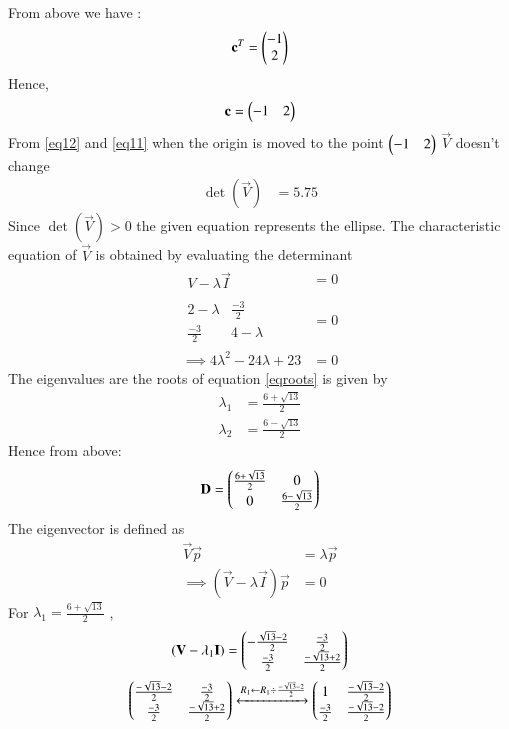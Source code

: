 \documentclass[journal,12pt,twocolumn]{IEEEtran}
\begin{document}
From above we have :
\begin{align}
 \mathbf{c}^T=
 \begin{pmatrix}
 -1\\2
 \end{pmatrix}
\end{align}
Hence,
\begin{align}
 \mathbf c=
\begin{pmatrix}
-1 &2\end{pmatrix}
\end{align}
From \eqref{eq12} and \eqref{eq11} when the origin is moved to the point  $\begin{pmatrix}-1 &2\end{pmatrix}$  $\vec{V}$ doesn't change
\begin{align}
    \det(\vec{V})&=5.75
\end{align}
Since $\det(\vec{V})>0$ the given equation represents the ellipse.
The characteristic equation of $\vec{V}$ is obtained by evaluating the determinant 
\begin{align}
       \begin{array}{|c|}
V-\lambda\vec{I}
\end{array}&=0\\
   \begin{array}{|cc|}
2-\lambda & \frac{-3}{2} \\ \frac{-3}{2} & 4-\lambda
\end{array}&=0\\
\implies 4\lambda^2-24\lambda+23&=0\label{eqroots}
\end{align}
The eigenvalues are the roots of equation \ref{eqroots} is given by 
\begin{align}
    \lambda_1&=\frac{6+\sqrt{13}}{2}\label{eqeig1}\\
    \lambda_2&=\frac{6-\sqrt{13}}{2}\label{eqeig2}
\end{align}
Hence from above:
\begin{align}\label{d}
    \mathbf{D}=
    \begin{pmatrix}
    \frac{6+\sqrt{13}}{2} & 0\\
     0 &\frac{6-\sqrt{13}}{2}
    \end{pmatrix}
\end{align}
The eigenvector  is defined as 
\begin{align}
    \vec{V}\vec{p}&=\lambda\vec{p}\\
    \implies (\vec{V}-\lambda\vec{I})\vec{p}&=0\label{eqev}
\end{align}
For $\lambda_1=\frac{6+\sqrt{13}}{2}$ ,
\begin{align}
    (\mathbf{V}-\lambda_1\mathbf{I})=\begin{pmatrix}-\frac{\sqrt{13}-2}{2} & \frac{-3}{2} \\\frac{-3}{2} & \frac{-\sqrt{13}+2}{2}\end{pmatrix}
\end{align}
\begin{align}
   \begin{pmatrix}\frac{-\sqrt{13}-2}{2} & \frac{-3}{2} \\\frac{-3}{2} & \frac{-\sqrt{13}+2}{2}\end{pmatrix}
    \xleftrightarrow[]{R_1 \leftarrow R_1\div\frac{-\sqrt{13}-2}{2}}
    \begin{pmatrix}
    1 &\frac{-\sqrt{13}-2}{2}\\
    \frac{-3}{2} & \frac{-\sqrt{13}-2}{2}
    \end{pmatrix}
\end{align}
\end{document}
